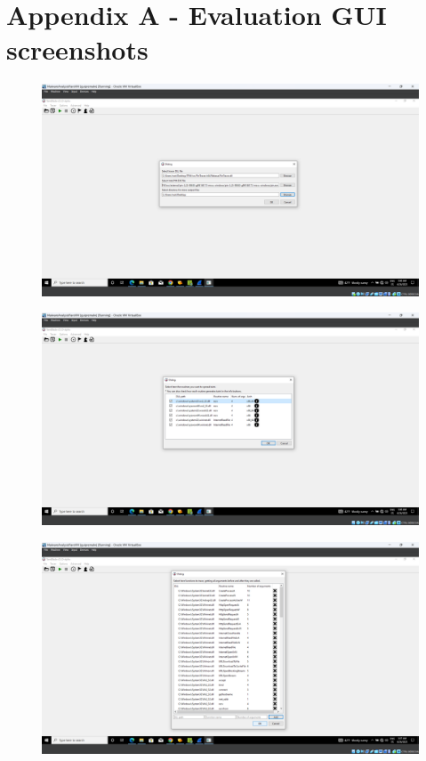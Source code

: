 \documentclass[conference]{IEEEtran}
\begin{document}
\newpage
\section*{Appendix A - Evaluation GUI screenshots}\label{appendix_eval_screenshots}

\begin{figure}
    \centerline{\includegraphics[width=\textwidth]{images/sch_s1.png}}
    \caption{}
    \label{figure:ap_sch_s1}
\end{figure}

\begin{figure}
    \centerline{\includegraphics[width=\textwidth]{images/sch_s2.png}}
    \caption{}
    \label{figure:ap_sch_s2}
\end{figure}

\begin{figure}
    \centerline{\includegraphics[width=\textwidth]{images/sch_s3.png}}
    \caption{}
    \label{figure:ap_sch_s3}
\end{figure}
\end{document}

